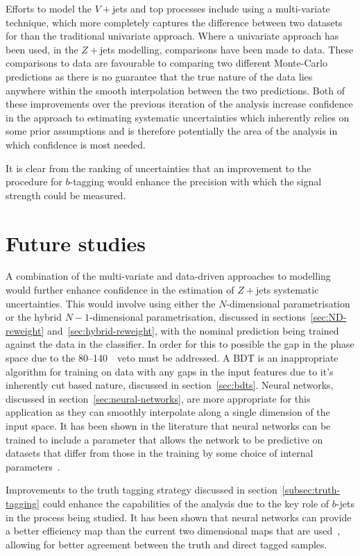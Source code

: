 Efforts to model the $V+$jets and top processes include using a multi-variate
technique, which more completely captures the difference between two datasets
for than the traditional univariate approach. Where a univariate approach has
been used, in the $Z+$jets modelling, comparisons have been made to data. These
comparisons to data are favourable to comparing two different Monte-Carlo
predictions as there is no guarantee that the true nature of the data lies
anywhere within the smooth interpolation between the two predictions. Both of
these improvements over the previous iteration of the analysis increase
confidence in the approach to estimating systematic uncertainties which
inherently relies on some prior assumptions and is therefore potentially the
area of the analysis in which confidence is most needed.

It is clear from the ranking of uncertainties that an improvement to the
procedure for $b$-tagging would enhance the precision with which the signal
strength could be measured.

\section{Future studies}%
\label{sec:future}

A combination of the multi-variate and data-driven approaches to modelling would
further enhance confidence in the estimation of $Z+$jets systematic
uncertainties. This would involve using either the $N$-dimensional
parametrisation or the hybrid $N-1$-dimensional parametrisation, discussed in
sections~\ref{sec:ND-reweight} and~\ref{sec:hybrid-reweight}, with the nominal
prediction being trained against the data in the classifier. In order for this
to possible the gap in the phase space due to the 80--140~\GeV\ veto must be
addressed. A BDT is an inappropriate algorithm for training on data with any
gaps in the input features due to it's inherently cut based nature, discussed in
section~\ref{sec:bdts}. Neural networks, discussed in
section~\ref{sec:neural-networks}, are more appropriate for this application as
they can smoothly interpolate along a single dimension of the input space. It
has been shown in the literature that neural networks can be trained to include
a parameter that allows the network to be predictive on datasets that differ
from those in the training by some choice of internal
parameters~\cite{param-hep, param-hep-2}.

Improvements to the truth tagging strategy discussed in
section~\ref{subsec:truth-tagging} could enhance the capabilities of the
analysis due to the key role of $b$-jets in the process being studied. It has
been shown that neural networks can provide a better efficiency map than the
current two dimensional maps that are used~\cite{nn-truth-tagging}, allowing for
better agreement between the truth and direct tagged samples.

